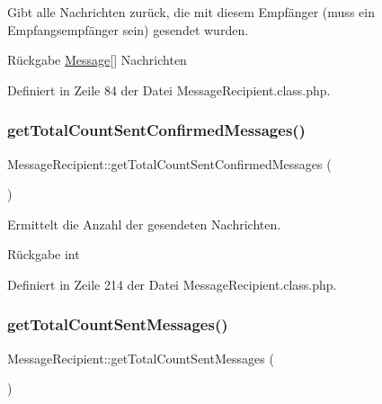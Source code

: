 Gibt alle Nachrichten zurück, die mit diesem Empfänger (muss ein Empfangsempfänger sein) gesendet wurden. \begin{DoxyReturn}{Rückgabe}
\mbox{\hyperlink{class_message}{Message}}\mbox{[}\mbox{]} Nachrichten 
\end{DoxyReturn}


Definiert in Zeile 84 der Datei Message\+Recipient.\+class.\+php.

\mbox{\label{class_message_recipient_a817d8fbe382a7cde13468f380a29fa07}} 
\subsubsection{\texorpdfstring{get\+Total\+Count\+Sent\+Confirmed\+Messages()}{getTotalCountSentConfirmedMessages()}}
{\footnotesize\ttfamily Message\+Recipient\+::get\+Total\+Count\+Sent\+Confirmed\+Messages (\begin{DoxyParamCaption}{ }\end{DoxyParamCaption})}

Ermittelt die Anzahl der gesendeten Nachrichten. \begin{DoxyReturn}{Rückgabe}
int 
\end{DoxyReturn}


Definiert in Zeile 214 der Datei Message\+Recipient.\+class.\+php.

\mbox{\label{class_message_recipient_ac9dce37505bc22950687cc62f28e69cb}} 
\subsubsection{\texorpdfstring{get\+Total\+Count\+Sent\+Messages()}{getTotalCountSentMessages()}}
{\footnotesize\ttfamily Message\+Recipient\+::get\+Total\+Count\+Sent\+Messages (\begin{DoxyParamCaption}{ }\end{DoxyParamCaption})}

